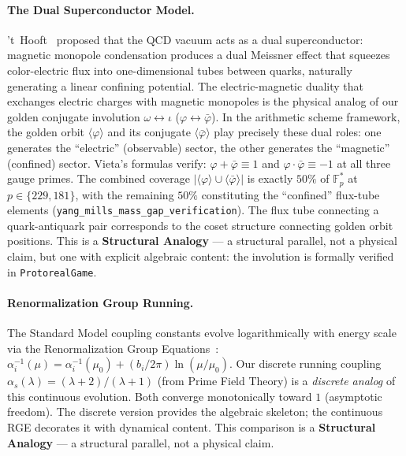 \paragraph{The Dual Superconductor Model.}
't~Hooft~\cite{thooft1981} proposed that the QCD vacuum acts as a dual superconductor: magnetic monopole condensation produces a dual Meissner effect that squeezes color-electric flux into one-dimensional tubes between quarks, naturally generating a linear confining potential. The electric-magnetic duality that exchanges electric charges with magnetic monopoles is the physical analog of our golden conjugate involution $\omega \leftrightarrow \iota$ ($\varphi \leftrightarrow \bar\varphi$). In the arithmetic scheme framework, the golden orbit $\langle\varphi\rangle$ and its conjugate $\langle\bar\varphi\rangle$ play precisely these dual roles: one generates the ``electric'' (observable) sector, the other generates the ``magnetic'' (confined) sector. Vieta's formulas verify: $\varphi + \bar\varphi \equiv 1$ and $\varphi \cdot \bar\varphi \equiv -1$ at all three gauge primes. The combined coverage $|\langle\varphi\rangle \cup \langle\bar\varphi\rangle|$ is exactly $50\%$ of $\mathbb{F}_p^*$ at $p \in \{229, 181\}$, with the remaining $50\%$ constituting the ``confined'' flux-tube elements (\texttt{yang\_mills\_mass\_gap\_verification}). The flux tube connecting a quark-antiquark pair corresponds to the coset structure connecting golden orbit positions. This is a \textbf{Structural Analogy} --- a structural parallel, not a physical claim, but one with explicit algebraic content: the involution is formally verified in \texttt{ProtorealGame}.

\paragraph{Renormalization Group Running.}
The Standard Model coupling constants evolve logarithmically with energy scale via the Renormalization Group Equations~\cite{wilczek1973}: $\alpha_i^{-1}(\mu) = \alpha_i^{-1}(\mu_0) + (b_i / 2\pi) \ln(\mu/\mu_0)$. Our discrete running coupling $\alpha_s(\lambda) = (\lambda + 2)/(\lambda + 1)$ (from Prime Field Theory) is a \emph{discrete analog} of this continuous evolution. Both converge monotonically toward $1$ (asymptotic freedom). The discrete version provides the algebraic skeleton; the continuous RGE decorates it with dynamical content. This comparison is a \textbf{Structural Analogy} --- a structural parallel, not a physical claim.

